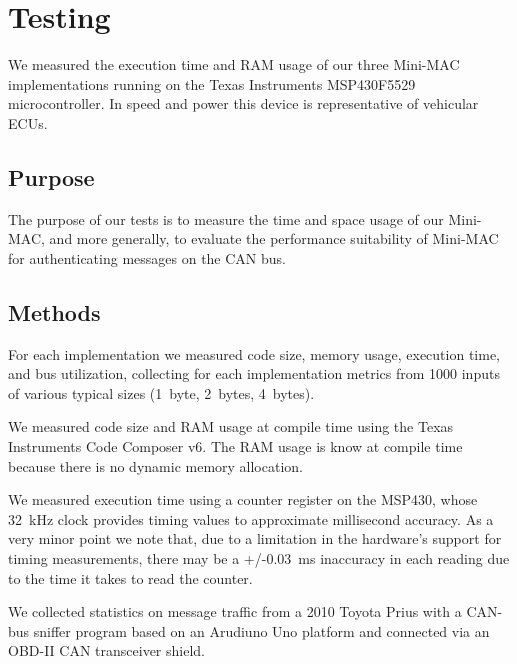 \section{Testing}
\label{testing}

We measured the execution time and RAM usage of our three Mini-MAC implementations 
running on the Texas Instruments MSP430F5529 microcontroller. 
In speed and power this device is representative of vehicular ECUs.

\subsection{Purpose}
\label{purpose}

The purpose of our tests is to measure the time and space usage of our Mini-MAC, and more generally,
to evaluate the performance suitability of Mini-MAC for authenticating messages on the CAN bus.

\subsection{Methods}
\label{methods}

For each implementation we measured code size, memory usage, execution time, and bus utilization,
collecting for each implementation metrics from 1000 inputs of various typical sizes (1~byte, 2~bytes, 4~bytes).  

We measured code size and RAM usage at compile time using 
the Texas Instruments Code Composer v6.
The RAM usage is know at compile time because there is no
dynamic memory allocation.

We measured execution time using a counter register on the MSP430, 
whose 32~kHz clock provides timing values to approximate millisecond accuracy. 
As a very minor point we note that, due to a limitation in the hardware's
support for timing measurements, 
there may be a +/-0.03~ms inaccuracy in each reading due to the
time it takes to read the counter.

We collected statistics on message traffic from a 2010 Toyota Prius with a CAN-bus sniffer program 
based on an Arudiuno Uno platform and connected via an OBD-II CAN transceiver shield.

%

